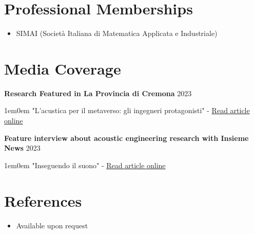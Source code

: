 \documentclass[11pt,a4paper]{article}
\newcommand{\cvdetail}[1]{%
  \begin{adjustwidth}{1em}{0em}
    #1
  \end{adjustwidth}%
  \vspace{0.5em}%
}
\newcommand{\cvsubitem}[2]{%
  \vspace{0.3em}%
  \noindent\textbf{#1} \hfill #2%
  \vspace{0.2em}%
}
\begin{document}
\section{Professional Memberships}

\begin{itemize}
  \item SIMAI (Società Italiana di Matematica Applicata e Industriale)
\end{itemize}

\section{Media Coverage}

\cvsubitem{Research Featured in La Provincia di Cremona}{2023}
\cvdetail{"L'acustica per il metaverso: gli ingegneri protagonisti" - \href{https://www.laprovinciacr.it/news/cronaca/418996/lacustica-per-il-metaverso-gli-ingegneri-protagonisti.html}{Read article online}}
\cvsubitem{Feature interview about acoustic engineering research with Insieme News}{2023}
\cvdetail{"Inseguendo il suono" - \href{https://www.insiemenews.it/2023/10/23/inseguendo-il-suono/}{Read article online}}

\section{References}

\begin{itemize}
  \item Available upon request
\end{itemize}
\end{document}
